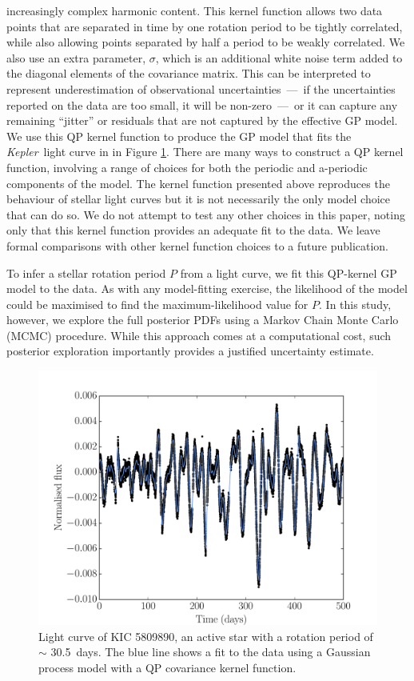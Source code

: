 \documentclass[useAMS, usenatbib, preprint, 12pt]{aastex}
\newcommand{\Kepler}{{\it Kepler}}
\newcommand{\kepexample}{5809890}
\newcommand{\kepexampleperiod}{30.5}
\begin{document}
increasingly complex harmonic content.
This kernel function allows two data points that are separated in time by one
rotation period to be tightly correlated, while also allowing
points separated by half a period to be weakly correlated.
We also use an extra parameter, $\sigma$, which is an additional white noise
term added to the diagonal elements of the covariance matrix.
This can be interpreted to represent underestimation of observational
uncertainties~---~if the uncertainties reported on the data are too small, it
will be non-zero~---~or it can capture any remaining ``jitter'' or residuals
that are not captured by the effective GP model.
We use this QP kernel function to produce the GP model
that fits the \Kepler\ light curve in in Figure \ref{fig:GP_example}.
There are many ways to construct a QP kernel function, involving a range of
choices for both the periodic and a-periodic components of the model.
The kernel function presented above reproduces the behaviour of stellar light
curves but it is not necessarily the only model choice that can do so.
We do not attempt to test any other choices in this paper, noting only that
this kernel function provides an adequate fit to the data.
We leave formal comparisons with other kernel function choices to a future
publication.

To infer a stellar rotation period $P$ from a light curve, we fit this
QP-kernel GP model to the data.  As with any model-fitting exercise, the
likelihood
of the model could be maximised to find the maximum-likelihood value for $P$.
In this study, however, we explore the full posterior PDFs using a Markov
Chain Monte Carlo (MCMC) procedure.  While
this approach comes at a computational cost, such posterior exploration
importantly provides a justified uncertainty estimate.

\begin{figure}
\begin{center}
\includegraphics[width=6in, clip=true]{figures/koi_lc_demo.pdf}
\caption[A light curve with a GP model.]
{Light curve of KIC \kepexample, an active star with a rotation period of
$\sim$ \kepexampleperiod\ days.
The blue line shows a fit to the data using a Gaussian process model with a QP
covariance kernel function.}
\label{fig:GP_example}
\end{center}
\end{figure}
\end{document}
